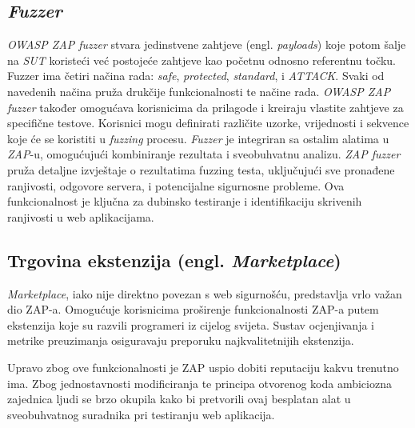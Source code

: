 \subsection{\textit{Fuzzer}}
\textit{OWASP ZAP fuzzer} stvara jedinstvene zahtjeve (engl. \textit{payloads}) koje potom šalje na \textit{SUT} koristeći već postojeće zahtjeve kao početnu odnosno 
referentnu točku. Fuzzer ima četiri načina rada: \textit{safe}, \textit{protected}, \textit{standard}, i \textit{ATTACK}. Svaki od navedenih načina pruža drukčije 
funkcionalnosti te načine rada.
\textit{OWASP ZAP fuzzer} također omogućava korisnicima da prilagode i kreiraju vlastite zahtjeve za specifične testove. Korisnici mogu definirati različite uzorke, 
vrijednosti i sekvence koje će se koristiti u \textit{fuzzing} procesu. \textit{Fuzzer} je integriran sa ostalim alatima u \textit{ZAP}-u, omogućujući kombiniranje rezultata i sveobuhvatnu 
analizu.
\textit{ZAP fuzzer} pruža detaljne izvještaje o rezultatima fuzzing testa, uključujući sve pronađene ranjivosti, odgovore servera, i potencijalne sigurnosne probleme. 
Ova funkcionalnost je ključna za dubinsko testiranje i identifikaciju skrivenih ranjivosti u web aplikacijama.\cite{ZAP_docs}

\subsection{Trgovina ekstenzija (engl. \textit{Marketplace})}
\textit{Marketplace}, iako nije direktno povezan s web sigurnošću, predstavlja vrlo važan dio ZAP-a. Omogućuje korisnicima proširenje funkcionalnosti ZAP-a 
putem ekstenzija koje su razvili programeri iz cijelog svijeta. Sustav ocjenjivanja i metrike preuzimanja osiguravaju preporuku najkvalitetnijih ekstenzija.

Upravo zbog ove funkcionalnosti je ZAP uspio dobiti reputaciju kakvu trenutno ima. Zbog jednostavnosti modificiranja te principa otvorenog koda ambiciozna zajednica ljudi se brzo okupila kako bi pretvorili ovaj besplatan alat u sveobuhvatnog suradnika pri testiranju web aplikacija.\cite{zap_feat}

\newpage
